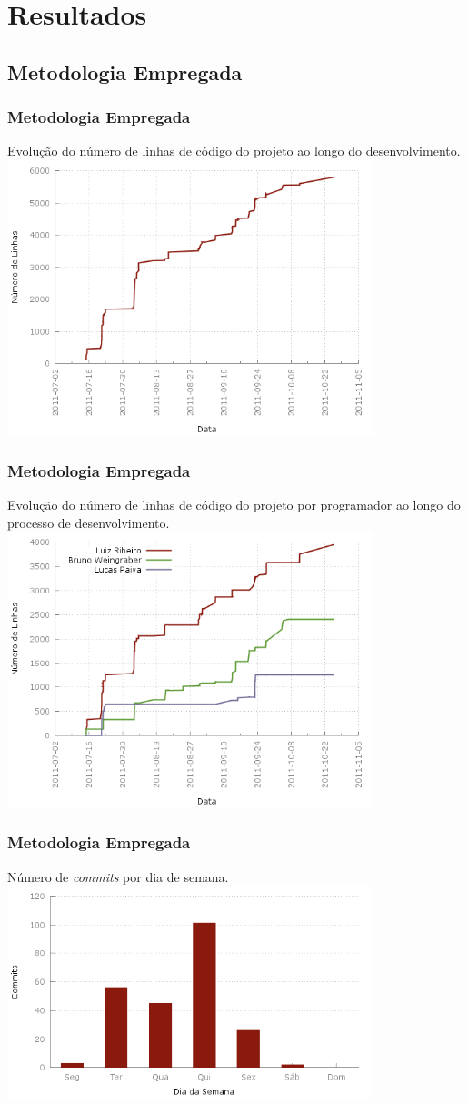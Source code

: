 \section{Resultados}

\subsection{Metodologia Empregada}
\frame
{
\frametitle{Metodologia Empregada}
Evolução do número de linhas de código do projeto ao longo do desenvolvimento.
\includegraphics[width=0.8\textwidth]{./imgs/lines_of_code.png}
}

\frame
{
\frametitle{Metodologia Empregada}
Evolução do número de linhas de código do projeto por programador ao longo do processo de desenvolvimento.
\includegraphics[width=0.8\textwidth]{./imgs/lines_of_code_by_author.png}
}

\frame
{
\frametitle{Metodologia Empregada}
Número de \emph{commits} por dia de semana.
\includegraphics[width=0.8\textwidth]{./imgs/day_of_week.png}
}

